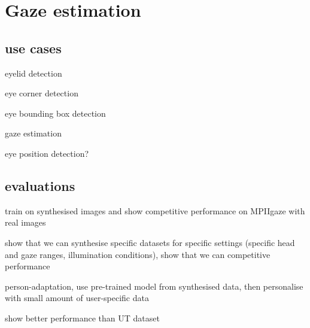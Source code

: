 
\section{Gaze estimation}

\subsection{use cases}

eyelid detection

eye corner detection

eye bounding box detection

gaze estimation

eye position detection?

\subsection{evaluations}

train on synthesised images and show competitive performance on MPIIgaze with real images

show that we can synthesise specific datasets for specific settings (specific head and gaze ranges, illumination conditions), show that we can competitive performance

person-adaptation, use pre-trained model from synthesised data, then personalise with small amount of user-specific data

show better performance than UT dataset